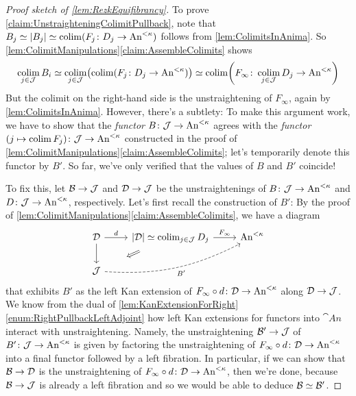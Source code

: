 \begin{proof}[Proof sketch of \cref{lem:RezkEquifibrancy}]
	To prove \cref{claim:UnstraighteningColimitPullback}, note that $B_j\simeq \left|B_j\right|\simeq \operatorname*{colim} (F_j\colon D_j\rightarrow \mathrm{An}^{<\kappa})$ follows from \cref{lem:ColimitsInAnima}. So \cref{lem:ColimitManipulations}\cref{claim:AssembleColimits} shows
	\begin{equation*}
		\colimit_{j\in\Jj}B_i\simeq \colimit_{j\in\Jj}\lef(\colimit(F_j\colon D_j\rightarrow \cat{An}^{<\kappa})\righ)\simeq \colimit\!\left(F_\infty\colon \colimit_{j\in\Jj}D_j\rightarrow\cat{An}^{<\kappa}\right)
	\end{equation*}
	But the colimit on the right-hand side is the unstraightening of $F_\infty$, again by \cref{lem:ColimitsInAnima}. However, there's a subtlety: To make this argument work, we have to show that the \emph{functor} $B\colon \mathcal{J}\rightarrow \mathrm{An}^{<\kappa}$ agrees with the \emph{functor} $(j\mapsto \operatorname*{colim} F_j)\colon \mathcal{J}\rightarrow\mathrm{An}^{<\kappa}$ constructed in the proof of \cref{lem:ColimitManipulations}\cref{claim:AssembleColimits}; let's temporarily denote this functor by $B'$. So far, we've only verified that the values of $B$ and $B'$ coincide! 
	
	To fix this, let $\mathcal{B}\rightarrow \mathcal{J}$ and $\mathcal{D}\rightarrow \mathcal{J}$ be the unstraightenings of $B\colon \mathcal{J}\rightarrow \mathrm{An}^{<\kappa}$ and $D\colon \mathcal{J}\rightarrow \mathrm{An}^{<\kappa}$, respectively. Let's first recall the construction of $B'$: By the proof of \cref{lem:ColimitManipulations}\cref{claim:AssembleColimits}, we have a diagram
	\begin{equation*}
		\begin{tikzcd}
			\Dd\rar["d"]\dar &\left|\Dd\right|\simeq \colimit_{j\in\Jj}D_j\rar["F_\infty"]\dlar[phantom,start anchor=center,end anchor=center,"\Longleftarrow"{sloped,pos=0.5}] & \cat{An}^{<\kappa}\\
			\Jj\ar[urr,bend right=15,dashed,"B'"'] & & 
		\end{tikzcd}
	\end{equation*}
	that exhibits $B'$ as the left Kan extension of $F_\infty\circ d\colon \mathcal{D}\rightarrow \mathrm{An}^{<\kappa}$ along $\mathcal{D}\rightarrow \mathcal{J}$. We know from the dual of \cref{lem:KanExtensionForRight}\cref{enum:RightPullbackLeftAdjoint} how left Kan extensions for functors into $\cat{An}$ interact with unstraightening. Namely, the unstraightening $\mathcal{B}'\rightarrow \mathcal{J}$ of $B'\colon \mathcal{J}\rightarrow \mathrm{An}^{<\kappa}$ is given by factoring the unstraightening of $F_\infty\circ d\colon \mathcal{D}\rightarrow \mathrm{An}^{<\kappa}$ into a final functor followed by a left fibration. In particular, if we can show that $\mathcal{B}\rightarrow\mathcal{D}$ is the unstraightening of $F_\infty\circ d\colon \mathcal{D}\rightarrow \mathrm{An}^{<\kappa}$, then we're done, because $\mathcal{B}\rightarrow\mathcal{J}$ is already a left fibration and so we would be able to deduce $\mathcal{B}\simeq \mathcal{B}'$.
	

\end{proof}
